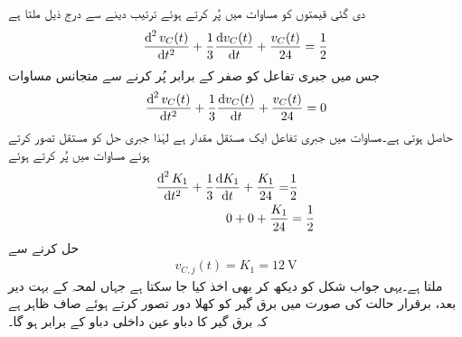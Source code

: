 دی گئی قیمتوں کو مساوات  میں  پُر کرتے ہوئے ترتیب دینے سے درج ذیل ملتا ہے
\begin{align}\label{مساوات_عارضی_مثال_سلسلہ_وار_پ}
\frac{\dif^{\,2} v_C(t)}{\dif t^2}+\frac{1}{3}\frac{\dif v_C(t)}{\dif t}+\frac{v_C(t)}{24}=\frac{1}{2}
\end{align}
جس میں جبری تفاعل کو صفر کے برابر پُر کرنے سے متجانس مساوات
\begin{align}\label{مساوات_مثال_ہم_جنسی_دو_درجی}
\frac{\dif^{\,2} v_C(t)}{\dif t^2}+\frac{1}{3}\frac{\dif v_C(t)}{\dif t}+\frac{v_C(t)}{24}=0
\end{align}
حاصل ہوتی ہے۔مساوات  میں جبری تفاعل ایک مستقل مقدار ہے لہٰذا جبری حل کو مستقل  تصور کرتے ہوئے مساوات  میں پُر کرتے ہوئے
\begin{align*}
\frac{\dif^{\,2} K_1}{\dif t^2}+\frac{1}{3}\frac{\dif K_1}{\dif t}+\frac{K_1}{24}=&\frac{1}{2}\\
0+0+\frac{K_1}{24}&=\frac{1}{2}
\end{align*}
حل کرنے سے
\begin{align*}
v_{C,j}(t)=K_1=\SI{12}{\volt}
\end{align*}
ملتا ہے۔یہی جواب شکل  کو دیکھ کر بھی اخذ کیا جا سکتا ہے جہاں لمحہ  کے بہت دیر بعد، برقرار  حالت کی صورت میں برق گیر کو کھلا دور تصور کرتے ہوئے صاف ظاہر ہے کہ برق گیر کا دباو عین داخلی دباو کے برابر ہو گا۔

